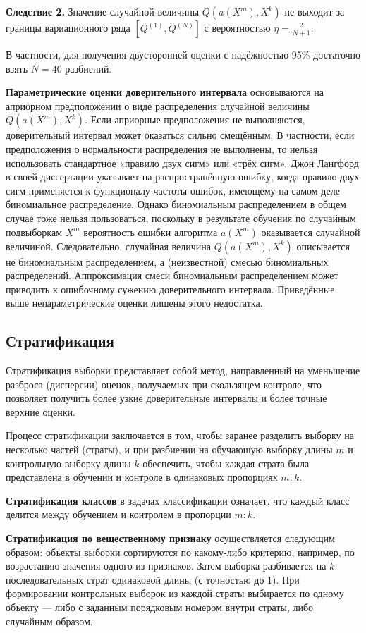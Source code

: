 \textbf{Следствие 2.} Значение случайной величины $Q(a(X^m), X^k)$ не выходит за границы вариационного ряда $\left[ Q^{(1)}, Q^{(N)} \right]$ с вероятностью $\eta = \frac{2}{N+1}$.

В частности, для получения двусторонней оценки с надёжностью 95\% достаточно взять $N=40$ разбиений.

\textbf{Параметрические оценки доверительного интервала} основываются на априорном предположении о виде распределения случайной величины $Q(a(X^m), X^k)$. Если априорные предположения не выполняются, доверительный интервал может оказаться сильно смещённым. В частности, если предположения о нормальности распределения не выполнены, то нельзя использовать стандартное «правило двух сигм» или «трёх сигм». Джон Лангфорд в своей диссертации \cite{Langford2002} указывает на распространённую ошибку, когда правило двух сигм применяется к функционалу частоты ошибок, имеющему на самом деле биномиальное распределение. Однако биномиальным распределением в общем случае тоже нельзя пользоваться, поскольку в результате обучения по случайным подвыборкам $X^m$ вероятность ошибки алгоритма $a(X^m)$ оказывается случайной величиной. Следовательно, случайная величина $Q(a(X^m), X^k)$ описывается не биномиальным распределением, а (неизвестной) смесью биномиальных распределений. Аппроксимация смеси биномиальным распределением может приводить к ошибочному сужению доверительного интервала. Приведённые выше непараметрические оценки лишены этого недостатка.

\subsection{Стратификация}

Стратификация выборки представляет собой метод, направленный на уменьшение разброса (дисперсии) оценок, получаемых при скользящем контроле, что позволяет получить более узкие доверительные интервалы и более точные верхние оценки.

Процесс стратификации заключается в том, чтобы заранее разделить выборку на несколько частей (страты), и при разбиении на обучающую выборку длины $m$ и контрольную выборку длины $k$ обеспечить, чтобы каждая страта была представлена в обучении и контроле в одинаковых пропорциях $m:k$.

\textbf{Стратификация классов} в задачах классификации означает, что каждый класс делится между обучением и контролем в пропорции $m:k$.

\textbf{Стратификация по вещественному признаку} осуществляется следующим образом: объекты выборки сортируются по какому-либо критерию, например, по возрастанию значения одного из признаков. Затем выборка разбивается на $k$ последовательных страт одинаковой длины (с точностью до 1). При формировании контрольных выборок из каждой страты выбирается по одному объекту — либо с заданным порядковым номером внутри страты, либо случайным образом.


